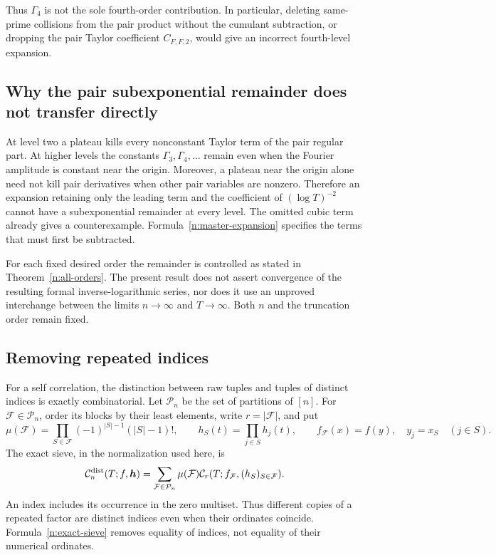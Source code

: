 \documentclass[11pt]{article}
\numberwithin{equation}{section}
\theoremstyle{remark}
\begin{document}
Thus $\Gamma_4$ is not the sole fourth-order contribution. In
particular, deleting same-prime collisions from the pair product without
the cumulant subtraction, or dropping the pair Taylor coefficient
$C_{F,F,2}$, would give an incorrect fourth-level expansion.

\subsection{Why the pair subexponential remainder does not transfer directly}

At level two a plateau kills every nonconstant Taylor term of the pair
regular part. At higher levels the constants $\Gamma_3,\Gamma_4,\ldots$
remain even when the Fourier amplitude is constant near the origin.
Moreover, a plateau near the origin alone need not kill pair derivatives
when other pair variables are nonzero. Therefore an expansion retaining
only the leading term and the coefficient of $(\log T)^{-2}$ cannot
have a subexponential remainder at every level. The omitted cubic term
already gives a counterexample. Formula~\eqref{n:master-expansion}
specifies the terms that must first be subtracted.

For each fixed desired order the remainder is controlled as stated in
Theorem~\ref{n:all-orders}. The present result does not assert convergence
of the resulting formal inverse-logarithmic series, nor does it use an
unproved interchange between the limits $n\to\infty$ and $T\to\infty$.
Both $n$ and the truncation order remain fixed.

\subsection{Removing repeated indices}

For a self correlation, the distinction between raw tuples and tuples
of distinct indices is exactly combinatorial. Let $\mathcal P_n$ be
the set of partitions of $[n]$. For $\mathcal F\in\mathcal P_n$, order
its blocks by their least elements, write $r=|\mathcal F|$, and put
\[
 \mu(\mathcal F)=\prod_{S\in\mathcal F}
                    (-1)^{|S|-1}(|S|-1)!,\qquad
 h_S(t)=\prod_{j\in S}h_j(t),\qquad
 f_{\mathcal F}(x)=f(y),\quad y_j=x_S\quad(j\in S).
\]
The exact sieve, in the normalization used here, is
\begin{equation}\label{n:exact-sieve}
 \mathcal C_n^{\rm dist}(T;f,\boldsymbol h)
   =\sum_{\mathcal F\in\mathcal P_n}\mu(\mathcal F)
      \mathcal C_r(T;f_{\mathcal F},(h_S)_{S\in\mathcal F}).
\end{equation}
An index includes its occurrence in the zero multiset. Thus different
copies of a repeated factor are distinct indices even when their
ordinates coincide. Formula~\eqref{n:exact-sieve} removes equality of
indices, not equality of their numerical ordinates.
\end{document}
